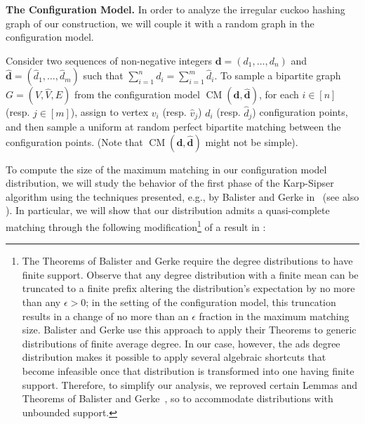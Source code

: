 \documentclass[11pt]{article}
\DeclareMathOperator*{\CM}{CM}
\begin{document}
{\bf The Configuration Model.} In order to analyze the irregular cuckoo hashing graph of our construction, we will  couple it with a random graph in the configuration model.
\begin{definition}
Consider two sequences of non-negative integers $\mathbf{d}=(d_1, \dots, d_n)$ and $\mathbf{\hat{d}}=(\hat{d}_1, \dots, \hat{d}_m)$ such that $\sum_{i=1}^n d_i = \sum_{i=1}^m \hat{d}_i$. To sample a bipartite graph $G=(V, \hat{V}, E)$ from the configuration model $\CM(\mathbf{d}, \mathbf{\hat{d}})$, for each $i\in[n]$ (resp. $j\in [m]$), assign to vertex $v_i$ (resp. $\hat{v}_j$) $d_i$ (resp. $\hat{d}_j$) configuration points, and then sample a uniform at random perfect bipartite matching between the configuration points. (Note that $\CM(\mathbf{d}, \mathbf{\hat{d}})$ might not be simple).
\end{definition}
To compute the size of the maximum matching in our configuration model distribution, we will study the behavior of the first phase of the Karp-Sipser algorithm using the techniques presented, e.g., by Balister and Gerke in~\cite{bg15} (see also \cite{afp98,bf11}).
In particular, we will show that our distribution admits a quasi-complete matching through the following  modification\footnote{The Theorems of Balister and Gerke require the degree distributions to have finite support. Observe that any degree distribution with a finite mean can be truncated to a finite prefix  altering the distribution's expectation  by no more than any  $\epsilon > 0$; in the setting of the configuration model, this truncation results in a change of no more than an $\epsilon$ fraction in the maximum matching size. Balister and Gerke use this approach to apply their Theorems to generic distributions of finite average degree. In our case, however, the ads degree distribution makes it possible to apply several algebraic shortcuts that become infeasible once that distribution is transformed into one having finite support. Therefore, to simplify our analysis, we reproved certain Lemmas and Theorems of Balister and Gerke~\cite{bg15}, so to accommodate distributions with unbounded support.} of a result in \cite{bg15}:
\end{document}
